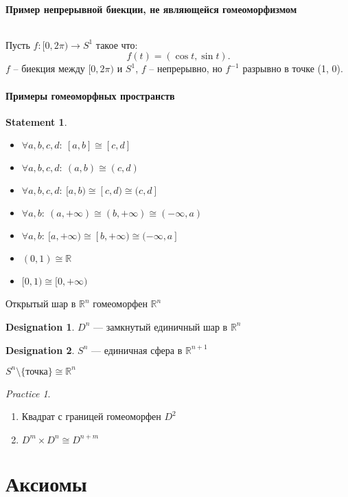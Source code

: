 \documentclass[11pt]{book}
\newcommand{\R}{\mathbb{R}}
\theoremstyle{definition}
\theoremstyle{plain}
\theoremstyle{plain}
\newtheorem*{st}{Statement}
\theoremstyle{definition}
\newtheorem*{name}{Designation}
\theoremstyle{remark}
\newtheorem*{prac}{Practice}
\begin{document}
\paragraph{Пример непрерывной биекции, не являющейся гомеоморфизмом}
$ $

Пусть $ f: [0, 2\pi) \to  S^{1}$ такое что:
\[
    f(t) = (\cos t , \sin t)
.\]
$ f$ -- биекция между $ [0, 2\pi)$ и $ S^{1}$, $ f$ -- непрерывно, но $ f^{-1} $ разрывно в точке (1, 0).
\paragraph{Примеры гомеоморфных пространств}
\begin{st}
    $ $
    \begin{itemize}
	\item $ \forall a , b, c, d: ~ [a, b] \cong [c, d]$
	\item $ \forall a, b, c, d:~ (a, b) \cong (c, d)$
	\item $ \forall a, b, c, d:~ [a, b) \cong [c, d) \cong (c, d]$
	\item $ \forall a, b: ~ (a, +\infty) \cong (b, +\infty) \cong (-\infty, a)$
	\item $ \forall a, b: ~ [a, +\infty) \cong [b, +\infty) \cong (-\infty, a]$
	\item $ (0, 1) \cong \R$
	\item $ [0, 1) \cong [0, +\infty)$
    \end{itemize}
\end{st}
\begin{thm}
    Открытый шар в $ \R^{n}$ гомеоморфен  $ \R^{n}$
\end{thm}
\begin{name}
    $ D^{n} $ --- замкнутый единичный шар в  $ \R^{n}$
\end{name}
\begin{name}
    $ S^{n} $ --- единичная сфера в $ \R^{n+1}$
\end{name}
\begin{thm}
    $ S^{n} \setminus \{\text{точка}\} \cong \R^{n}$
\end{thm}
\begin{prac}
    $ $
    \begin{enumerate}
	\item Квадрат с границей гомеоморфен $ D^2$
	\item $ D^{m} \times D^{n} \cong D ^{n+m}$
    \end{enumerate}
\end{prac}
\section{Аксиомы}
\end{document}
